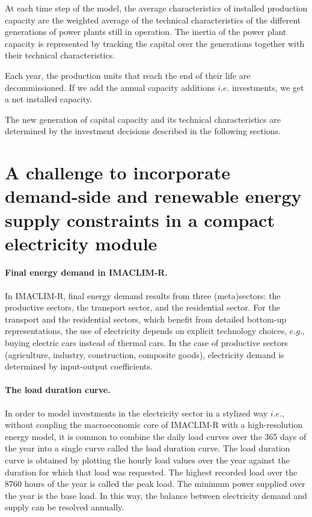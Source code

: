 At each time step of the model, the average characteristics of installed production capacity are the weighted average of the technical characteristics of the different generations of power plants still in operation.
The inertia of the power plant capacity is represented by tracking the capital over the generations together with their technical characteristics.

Each year, the production units that reach the end of their life are decommissioned.
If we add the annual capacity additions $i.e.$ investments, we get a net installed capacity.

The new generation of capital capacity and its technical characteristics are determined by the investment decisions described in the following sections.
\section{A challenge to incorporate demand-side and renewable energy supply constraints in a compact electricity module}

\paragraph{Final energy demand in IMACLIM-R.}

In IMACLIM-R, final energy demand results from three (meta)sectors: the productive sectors, the transport sector, and the residential sector. For the transport and the residential sectors, which benefit from detailed bottom-up representations, the use of electricity depends on explicit technology choices, $e.g.$, buying electric cars instead of thermal cars. In the case of productive sectors (agriculture, industry, construction, composite goods), electricity demand is determined by input-output coefficients.

\paragraph{The load duration curve.}

In order to model investments in the electricity sector in a stylized way $i.e$., without coupling the macroeconomic core of IMACLIM-R with a high-resolution energy model, it is common to combine the daily load curves over the 365 days of the year into a single curve called the load duration curve.
The load duration curve is obtained by plotting the hourly load values over the year against the duration for which that load was requested. The highest recorded load over the 8760 hours of the year is called the peak load. The minimum power supplied over the year is the base load. In this way, the balance between electricity demand and supply can be resolved annually.

